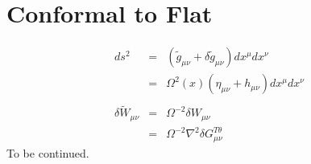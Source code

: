 \documentclass[10pt,letterpaper]{article}
\numberwithin{equation}{section}
\begin{document}
\section{Conformal to Flat}
\begin{eqnarray}
ds^2 &=& (\tilde g_{\mu\nu} + \delta \tilde g_{\mu\nu})dx^\mu dx^\nu
\nonumber\\
&=&\Omega^2(x)(\eta_{\mu\nu} + h_{\mu\nu})dx^\mu dx^\nu
\nonumber\\ \nonumber\\
\delta \tilde W_{\mu\nu} &=& \Omega^{-2} \delta W_{\mu\nu}
\nonumber\\
&=& \Omega^{-2}\nabla^2 \delta G^{T\theta}_{\mu\nu}
\end{eqnarray}
To be continued.
\end{document}
